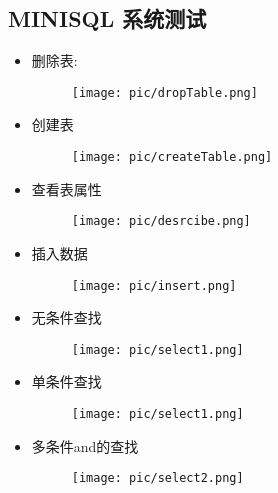 \documentclass[10pt]{article}
\begin{document}
\begin{CJK}{UTF8}{gkai}
	\section{MINISQL 系统测试}
	\begin{itemize}
		\item 删除表:
		\begin{figure}[H]
			\begin{center}
				\texttt{[image: pic/dropTable.png]}
			\end{center}
		\end{figure}
		\item 创建表
		\begin{figure}[H]
			\begin{center}
				\texttt{[image: pic/createTable.png]}
			\end{center}
		\end{figure}
		\item 查看表属性
			\begin{figure}[H]
				\begin{center}
					\texttt{[image: pic/desrcibe.png]}
				\end{center}
			\end{figure}
		\item 插入数据
		\begin{figure}[H]
			\begin{center}
				\texttt{[image: pic/insert.png]}
			\end{center}
		\end{figure}
		\item 无条件查找
		\begin{figure}[H]
			\begin{center}
				\texttt{[image: pic/select1.png]}
			\end{center}
		\end{figure}
		\item 单条件查找
		\begin{figure}[H]
			\begin{center}
				\texttt{[image: pic/select1.png]}
			\end{center}
		\end{figure}
		\item 多条件and的查找
		\begin{figure}[H]
			\begin{center}
				\texttt{[image: pic/select2.png]}
			\end{center}

\end{figure}
\end{itemize}
\end{CJK}
\end{document}
